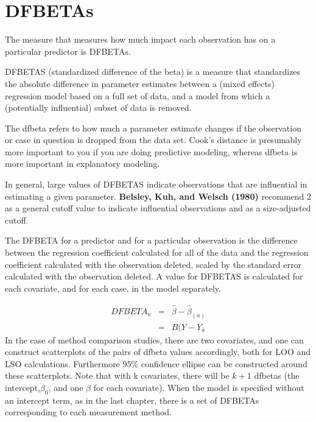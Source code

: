 \documentclass[12pt, a4paper]{report}
\theoremstyle{plain}
\theoremstyle{definition}
\theoremstyle{remark}
\begin{document}
%
%






\section{DFBETAs}
The measure that measures how much impact each observation has on a particular predictor is DFBETAs. 


DFBETAS (standardized difference of the beta) is a measure that standardizes the absolute difference in parameter estimates between a (mixed effects) regression model based on a full set of data, and a model from which a (potentially influential) subset of data is removed. 


The dfbeta refers to how much a parameter estimate changes if the observation or case in question is dropped from the data set.
Cook's distance is presumably more important to you if you are doing predictive modeling, whereas dfbeta is more important in explanatory modeling.

In general, large values of DFBETAS indicate observations that are influential in estimating a given parameter. \textbf{Belsley, Kuh, and Welsch (1980)} recommend 2 as a general cutoff value to indicate influential observations and  as a size-adjusted cutoff.

The DFBETA for a predictor and for a particular observation is the difference between the regression coefficient calculated for all of the data and the regression coefficient calculated with the observation deleted, scaled by the standard error calculated with the observation deleted. 
A value for DFBETAS is calculated for each covariate, and for each case, in the model separately.



\begin{eqnarray}
DFBETA_{a} &=& \hat{\beta} - \hat{\beta}_{(a)} \\
&=& B(Y-Y_{\bar{a}}
\end{eqnarray}
In the case of method comparison studies, there are two covariates, and one can construct scatterplots of the pairs of dfbeta values accordingly, both for LOO and LSO calculations. Furthermore 95\% confidence ellipse can be constructed around these scatterplots.
Note that with k covariates, there will be $k+1$ dfbetas (the intercept,$\beta_0$, and one $\beta$ for each covariate). When the model is specified without an intercept term, as in the last chapter, there is a set of DFBETAs corresponding to each measurement method.
\end{document}
